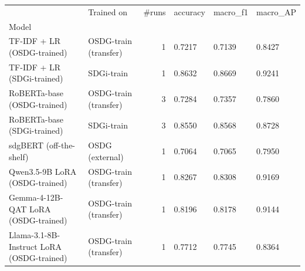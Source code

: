 \begin{tabular}{llrlll}
\toprule
 & Trained on & #runs & accuracy & macro_f1 & macro_AP \\
Model &  &  &  &  &  \\
\midrule
TF-IDF + LR (OSDG-trained) & OSDG-train (transfer) & 1 & 0.7217 & 0.7139 & 0.8427 \\
TF-IDF + LR (SDGi-trained) & SDGi-train & 1 & 0.8632 & 0.8669 & 0.9241 \\
RoBERTa-base (OSDG-trained) & OSDG-train (transfer) & 3 & 0.7284 & 0.7357 & 0.7860 \\
RoBERTa-base (SDGi-trained) & SDGi-train & 3 & 0.8550 & 0.8568 & 0.8728 \\
sdgBERT (off-the-shelf) & OSDG (external) & 1 & 0.7064 & 0.7065 & 0.7950 \\
Qwen3.5-9B LoRA (OSDG-trained) & OSDG-train (transfer) & 1 & 0.8267 & 0.8308 & 0.9169 \\
Gemma-4-12B-QAT LoRA (OSDG-trained) & OSDG-train (transfer) & 1 & 0.8196 & 0.8178 & 0.9144 \\
Llama-3.1-8B-Instruct LoRA (OSDG-trained) & OSDG-train (transfer) & 1 & 0.7712 & 0.7745 & 0.8364 \\
\bottomrule
\end{tabular}
